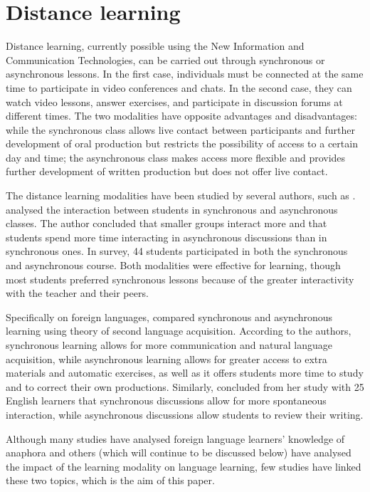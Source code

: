 \documentclass{textolivre}
\begin{document}
\section{Distance learning}\label{sec-dist-learn}
Distance learning, currently possible using the New Information and
Communication Technologies, can be carried out through synchronous or
asynchronous lessons. In the first case, individuals must be connected
at the same time to participate in video conferences and chats. In the
second case, they can watch video lessons, answer exercises, and
participate in discussion forums at different times. The two modalities
have opposite advantages and disadvantages: while the synchronous class
allows live contact between participants and further development of oral
production but restricts the possibility of access to a certain day and
time; the asynchronous class makes access more flexible and provides
further development of written production but does not offer live
contact.

The distance learning modalities have been studied by several authors,
such as \textcite{chou_comparative_2002,skylar_comparison_2009}. \textcite{chou_comparative_2002} analysed the
interaction between students in synchronous and asynchronous classes.
The author concluded that smaller groups interact more and that students
spend more time interacting in asynchronous discussions than in
synchronous ones. In  survey, 44 students participated in
both the synchronous and asynchronous course. Both modalities were
effective for learning, though most students preferred synchronous
lessons because of the greater interactivity with the teacher and their
peers.

Specifically on foreign languages, \textcite{chen_adoption_2007} compared
synchronous and asynchronous learning using  theory of
second language acquisition. According to the authors, synchronous
learning allows for more communication and natural language acquisition,
while asynchronous learning allows for greater access to extra materials
and automatic exercises, as well as it offers students more time to
study and to correct their own productions. Similarly, 
concluded from her study with 25 English learners that synchronous
discussions allow for more spontaneous interaction, while asynchronous
discussions allow students to review their writing.

Although many studies have analysed foreign language learners' knowledge
of anaphora and others (which will continue to be discussed below) have
analysed the impact of the learning modality on language learning, few
studies have linked these two topics, which is the aim of this paper.
\end{document}
